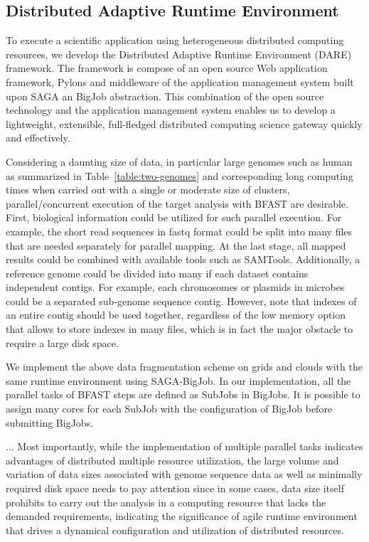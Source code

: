 \documentclass{acm_proc_article-sp}
\begin{document}

\subsection{Distributed Adaptive Runtime Environment}

To execute a scientific application using heterogeneous distributed
computing resources, we develop the Distributed Adaptive Runtime
Environment (DARE) framework\cite{dareurl}.  The framework is compose
of an open source Web application framework, Pylons and middleware of
the application management system built upon SAGA an BigJob
abstraction\cite{saga-ccgrid10,saga-royalsoc,saga-web,jha2009developing,ecmls10}.
This combination of the open source technology and the application
management system enables us to develop a lightweight, extensible,
full-fledged distributed computing science gateway quickly and
effectively\cite{pylonsurl}.

Considering a daunting size of data, in particular large genomes such as human as summarized in 
Table~\ref{table:two-genomes} and corresponding long computing times when carried out with a 
single or moderate size of clusters, parallel/concurrent execution of the target analysis with BFAST are desirable. 
 First, biological information could be utilized for such parallel execution. 
 For example, the short read sequences in fastq format could be split into many files that are 
 needed separately for parallel mapping.  At the last stage, all mapped results could be combined 
 with available tools such as SAMTools\cite{samtools}.   Additionally, a reference genome could be 
 divided into many if each dataset contains independent contigs.  For example, each chromosomes 
 or plasmids in microbes could be a separated sub-genome sequence contig.  However, note that 
 indexes of an entire contig should be used together, regardless of the low memory option that allows 
 to store indexes in many files, which is in fact the major obstacle to require a large disk space.

We implement the above data fragmentation scheme on grids and clouds with the same runtime environment using 
SAGA-BigJob\cite{saga-royalsoc,saga-ccgrid10, ecmls10}.  In our implementation, all the parallel tasks of BFAST 
steps are defined as SubJobs in BigJobs.  It is possible to assign many cores for each SubJob 
with the configuration of BigJob before submitting BigJobs. 
  
... Most importantly, while the implementation
of multiple parallel tasks indicates advantages of distributed
multiple resource utilization, the large volume and variation of data
sizes associated with genome sequence data as well as minimally
required disk space needs to pay attention since in some cases, data
size itself prohibits to carry out the analysis in a computing
resource that lacks the demanded requirements, indicating the
significance of agile runtime environment that drives a dynamical
configuration and utilization of distributed resources.
\end{document}
